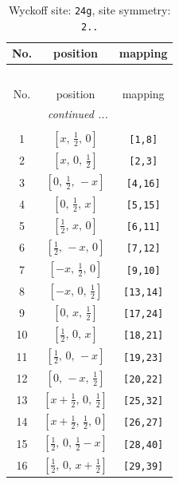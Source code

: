\documentclass[fleqn,8pt]{jsarticle}
\begin{document}
\renewcommand{\arraystretch}{1.2}
\begin{longtable}{ccc}
\caption{Wyckoff site: {\tt 24g}, site symmetry: {\tt 2..}}
 \\
 \hline \hline
No. & position & mapping \\ \hline \endfirsthead

\multicolumn{2}{l}{\tablename\ \thetable{}} \\
 \hline \hline
No. & position & mapping \\ \hline \endhead

 \hline \hline
\multicolumn{2}{r}{\footnotesize\it continued ...} \\ \endfoot

 \hline \hline
\multicolumn{2}{r}{} \\ \endlastfoot

1 & $\left[ x,\, \frac{1}{2},\, 0 \right]$ & {\tt [1,8]} \\ \hline
2 & $\left[ x,\, 0,\, \frac{1}{2} \right]$ & {\tt [2,3]} \\ \hline
3 & $\left[ 0,\, \frac{1}{2},\, - x \right]$ & {\tt [4,16]} \\ \hline
4 & $\left[ 0,\, \frac{1}{2},\, x \right]$ & {\tt [5,15]} \\ \hline
5 & $\left[ \frac{1}{2},\, x,\, 0 \right]$ & {\tt [6,11]} \\ \hline
6 & $\left[ \frac{1}{2},\, - x,\, 0 \right]$ & {\tt [7,12]} \\ \hline
7 & $\left[ - x,\, \frac{1}{2},\, 0 \right]$ & {\tt [9,10]} \\ \hline
8 & $\left[ - x,\, 0,\, \frac{1}{2} \right]$ & {\tt [13,14]} \\ \hline
9 & $\left[ 0,\, x,\, \frac{1}{2} \right]$ & {\tt [17,24]} \\ \hline
10 & $\left[ \frac{1}{2},\, 0,\, x \right]$ & {\tt [18,21]} \\ \hline
11 & $\left[ \frac{1}{2},\, 0,\, - x \right]$ & {\tt [19,23]} \\ \hline
12 & $\left[ 0,\, - x,\, \frac{1}{2} \right]$ & {\tt [20,22]} \\ \hline
13 & $\left[ x + \frac{1}{2},\, 0,\, \frac{1}{2} \right]$ & {\tt [25,32]} \\ \hline
14 & $\left[ x + \frac{1}{2},\, \frac{1}{2},\, 0 \right]$ & {\tt [26,27]} \\ \hline
15 & $\left[ \frac{1}{2},\, 0,\, \frac{1}{2} - x \right]$ & {\tt [28,40]} \\ \hline
16 & $\left[ \frac{1}{2},\, 0,\, x + \frac{1}{2} \right]$ & {\tt [29,39]} \\ \hline

\end{longtable}
\end{document}
